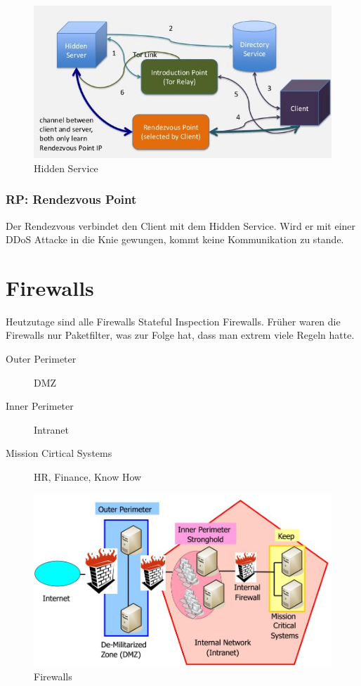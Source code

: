 \begin{figure}[h]
\centering
\includegraphics[width=0.7\linewidth]{images/hiddenservice}
\caption{Hidden Service}
\label{fig:hiddenservice}
\end{figure}

\subsubsection{RP: Rendezvous Point}
Der Rendezvous verbindet den Client mit dem Hidden Service. Wird er mit einer DDoS Attacke in die Knie gewungen, kommt keine Kommunikation zu stande.


\section{Firewalls}
Heutzutage sind alle Firewalls Stateful Inspection Firewalls. Früher waren die Firewalls nur Paketfilter, was zur Folge hat, dass man extrem viele Regeln hatte.
\begin{description}
	\item[Outer Perimeter] DMZ
	\item[Inner Perimeter] Intranet
	\item[Mission Cirtical Systems] HR, Finance, Know How
\end{description}

\begin{figure}[h]
\centering
\includegraphics[width=0.7\linewidth]{images/firewall}
\caption{Firewalls}
\label{fig:firewall}
\end{figure}

